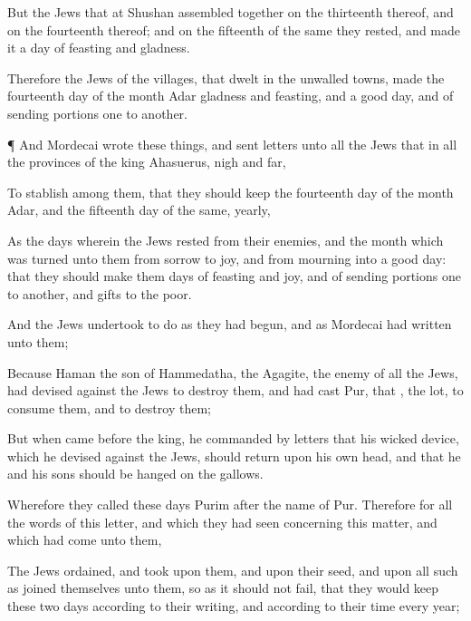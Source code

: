 {But the
Jews that
{} at
Shushan assembled
together on the
thirteenth
{} thereof, and on the
fourteenth thereof; and on the
fifteenth
{} of the same they
rested, and
made it a
day of
feasting and
gladness.

Therefore the
Jews of the
villages, that
dwelt in the
unwalled
towns,
made the
fourteenth
day of the
month
Adar
{}
gladness and
feasting, and a
good
day, and of
sending
portions
one to
another.


\par }{\PP {}¶ And
Mordecai
wrote these
things, and
sent
letters unto all the
Jews that
{} in all the
provinces of the
king
Ahasuerus,
{}
nigh and
far,

To
stablish
{} among them, that they should
keep the
fourteenth
day of the
month
Adar, and the
fifteenth
day of the same,
yearly,

As the
days wherein the
Jews
rested from their
enemies, and the
month which was
turned unto them from
sorrow to
joy, and from
mourning into a
good
day: that they should
make them
days of
feasting and
joy, and of
sending
portions
one to
another, and
gifts to the
poor.

And the
Jews
undertook to
do as they had
begun, and as
Mordecai had
written unto them;

Because
Haman the
son of
Hammedatha, the
Agagite, the
enemy of all the
Jews, had
devised against the
Jews to
destroy them, and had
cast
Pur, that
{}, the
lot, to
consume them, and to
destroy them;

But when
{}
came
before the
king, he
commanded by
letters that his
wicked
device, which he
devised against the
Jews, should
return upon his own
head, and that he and his
sons should be
hanged on the
gallows.

Wherefore they
called these
days
Purim after the
name of
Pur. Therefore for all the
words of this
letter, and
{} which they had
seen concerning this
matter, and which had
come unto them,

The
Jews
ordained, and
took upon them, and upon their
seed, and upon all such as
joined themselves unto them, so as it should not
fail, that they would
keep these
two
days according to their
writing, and according to their
{}
time every
year;

}
